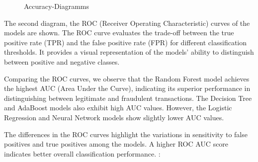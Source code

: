 \documentclass[a4, 10 pt, conference]{ieeeconf}  %
\begin{document}
{\begin{figure}[h]
  \caption{Accuracy-Diagramms} \newline
  \end{figure} 
  \begin{itemize}
  \textbfn The second diagram, the ROC (Receiver Operating Characteristic) curves of the models are shown. The ROC curve evaluates the trade-off between the true positive rate (TPR) and the false positive rate (FPR) for different classification thresholds. It provides a visual representation of the models' ability to distinguish between positive and negative classes.

Comparing the ROC curves, we observe that the Random Forest model achieves the highest AUC (Area Under the Curve), indicating its superior performance in distinguishing between legitimate and fraudulent transactions. The Decision Tree and AdaBoost models also exhibit high AUC values. However, the Logistic Regression and Neural Network models show slightly lower AUC values.

The differences in the ROC curves highlight the variations in sensitivity to false positives and true positives among the models. A higher ROC AUC score indicates better overall classification performance. :
\end{itemize}


  
}
\end{document}
